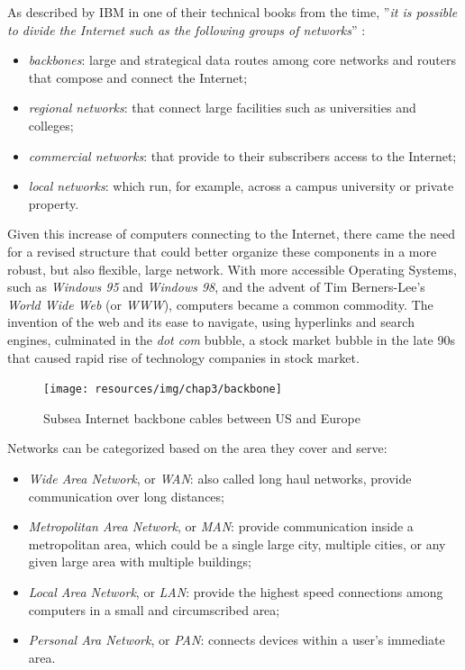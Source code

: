 		As described by IBM in one of their technical books from the time, ''\textit{it is possible to divide the Internet such as the following groups of networks}'' \cite{gg243376}:
		\begin{itemize}
			\item \textit{backbones}: large and strategical data routes among core networks and routers that compose and connect the Internet;
			\item \textit{regional networks}: that connect large facilities such as universities and colleges;
			\item \textit{commercial networks}: that provide to their subscribers access to the Internet;
			\item \textit{local networks}: which run, for example, across a campus university or private property.
		\end{itemize}

		Given this increase of computers connecting to the Internet, there came the need for a revised structure that could better organize these components in a more robust, but also flexible, large network.
		With more accessible Operating Systems, such as \textit{Windows 95} and \textit{Windows 98}, and the advent of Tim Berners-Lee's \textit{World Wide Web} (or \textit{WWW}), computers became a common commodity.
		The invention of the web and its ease to navigate, using hyperlinks and search engines, culminated in the \textit{dot com} bubble, a stock market bubble in the late 90s that caused rapid rise of technology companies in stock market.
	
		\begin{figure}[H]
			\centering
			\texttt{[image: resources/img/chap3/backbone]}
			\caption[Subsea Internet backbone cables between US and Europe]{Subsea Internet backbone cables between US and Europe\footnotemark}
		\end{figure}
	
		Networks can be categorized based on the area they cover and serve:
		\begin{itemize}
			\item \textit{Wide Area Network}, or \textit{WAN}: also called long haul networks, provide communication over long distances;
			\item \textit{Metropolitan Area Network}, or \textit{MAN}: provide communication inside a metropolitan area, which could be a single large city, multiple cities, or any given large area with multiple buildings;
			\item \textit{Local Area Network}, or \textit{LAN}: provide the highest speed connections among computers in a small and circumscribed area;
			\item \textit{Personal Ara Network}, or \textit{PAN}: connects devices within a user's immediate area.
		\end{itemize}
	
